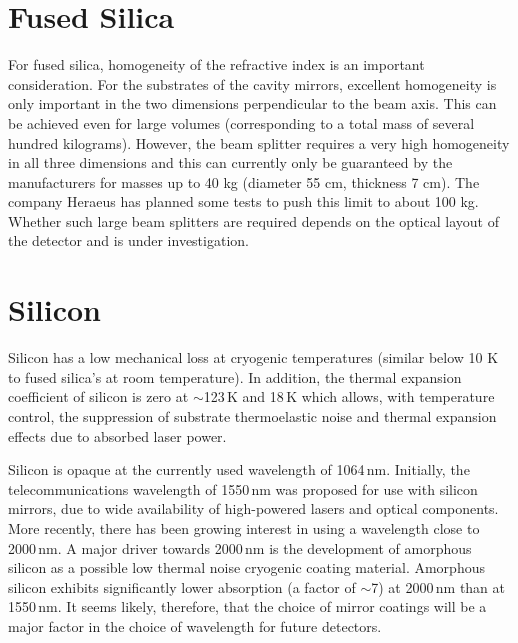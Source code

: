\section{Fused Silica} 
For fused silica, homogeneity of the refractive index is an important consideration. For the substrates of the cavity mirrors, excellent homogeneity is only important in the two dimensions perpendicular to the beam axis. This can be achieved even for large volumes (corresponding to a total mass of several hundred kilograms). However, the beam splitter requires a very high homogeneity in all three dimensions and this can currently only be guaranteed by the manufacturers for masses up to 40 kg (diameter 55 cm, thickness 7 cm). The company Heraeus has planned some tests to push this limit to about 100 kg. Whether such large beam splitters are required depends on the optical layout of the detector and is under investigation.

\section{Silicon}
Silicon has a low mechanical loss at cryogenic temperatures (similar below 10 K to fused silica's at room temperature).
In addition, the thermal expansion coefficient of silicon is zero at $\sim$123\,K and 18\,K which allows, with temperature control, the suppression of substrate thermoelastic noise and thermal expansion effects due to absorbed laser power.

Silicon is opaque at the currently used wavelength of 1064\,nm. Initially, the telecommunications wavelength of 1550\,nm was proposed for use with silicon mirrors, due to wide availability of high-powered lasers and optical components. More recently, there has been growing interest in using a wavelength close to 2000\,nm. A major driver towards 2000\,nm is the development of amorphous silicon as a possible low thermal noise cryogenic coating material. Amorphous silicon exhibits significantly lower absorption (a factor of $\sim$7) at 2000\,nm than at 1550\,nm. It seems likely, therefore, that the choice of mirror coatings will be a major factor in the choice of wavelength for future detectors. 

